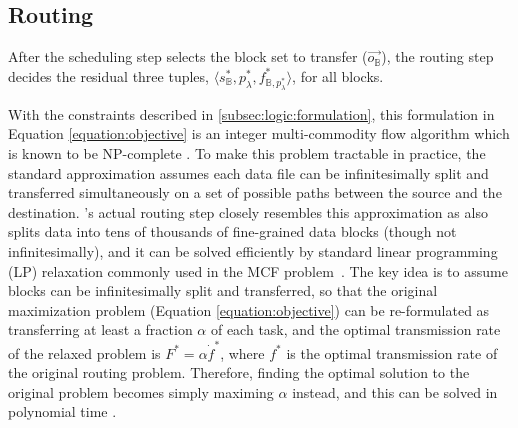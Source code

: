 \subsection{Routing}
\label{subsec:logic:routing}

After the scheduling step selects the block set to transfer ($\overrightarrow{o_\mathbb{B}}$), the routing step decides the residual three tuples, $\langle s_{\mathbb{B}}^*, p_{\lambda}^*, f^*_{\mathbb{B},p_{\lambda}^*} \rangle$, for all blocks.%

With the constraints described in \Section\ref{subsec:logic:formulation}, this formulation in Equation \ref{equation:objective} is an integer multi-commodity flow algorithm which is known to be NP-complete \cite{garg1997primal}.
To make this problem tractable in practice,
the standard approximation assumes each data file can be infinitesimally split and transferred simultaneously on a set of possible paths between the source and the destination.
\name's actual routing step closely resembles this approximation as \name also splits data into tens of thousands of fine-grained data blocks (though not infinitesimally), and it can be solved efficiently by standard linear programming (LP) relaxation commonly used in the MCF problem~\cite{garg2007faster,reed2012traffic}.
The key idea is to assume blocks can be infinitesimally split and transferred, so that the original maximization problem (Equation \ref{equation:objective}) can be re-formulated as transferring at least a fraction $\alpha$ of each task,%
and the optimal transmission rate of the relaxed problem is $F^*=\alpha\dot f^*$, where $f^*$ is the optimal transmission rate of the original routing problem.
Therefore, finding the optimal solution to the original problem becomes simply maximing $\alpha$ instead, and this can be solved in polynomial time \cite{reed2012traffic}.

